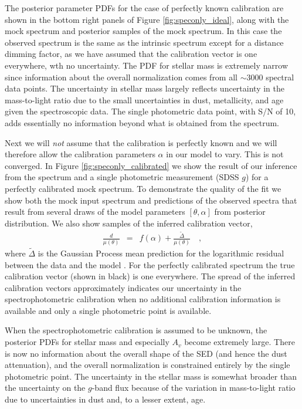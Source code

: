 \documentclass[iop,numberedappendix]{emulateapj}
\begin{document}
The posterior parameter PDFs for the case of perfectly known
calibration are shown in the bottom right panels of Figure
\ref{fig:speconly_ideal}, along with the mock spectrum and posterior
samples of the mock spectrum.  In this case the observed spectrum is
the same as the intrinsic spectrum except for a distance dimming
factor, as we have assumed that the calibration vector is one
everywhere, wth no uncertainty. The PDF for stellar mass is extremely
narrow since information about the overall normalization comes from all
$\sim 3000$ spectral data points.  The uncertainty in stellar mass
largely reflects uncertainty in the mass-to-light ratio due to the
small uncertainties in dust, metallicity, and age given the
spectroscopic data. The single photometric data point,
with S/N of 10, adds essentially no information beyond what is
obtained from the spectrum.

Next we will \emph{not} assume that the calibration is perfectly known
and we will therefore allow the calibration parameters $\alpha$ in our
model to vary.  {\color{red} This is not converged.} In Figure
\ref{fig:speconly_calibrated} we show the result of our inference from
the spectrum and a single photometric measurement (SDSS $g$) for a
perfectly calibrated mock spectrum. To demonstrate the quality of the
fit we show both the mock input spectrum and predictions of the
observed spectra that result from several draws of the model
parameters $[\theta, \alpha]$ from posterior distribution.  We also
show samples of the inferred calibration vector,
\begin{eqnarray} \label{eq:calibration}
\frac{d}{\mu(\theta)} & = & f(\alpha) + \frac{\tilde{\Delta}}{\mu(\theta)}
\quad ,
\end{eqnarray}
where $\tilde{\Delta}$ is the Gaussian Process mean prediction for the
logarithmic residual between the data and the model \citep{RW}.  For the
perfectly calibrated spectrum the true calibration vector (shown in
black) is one everywhere.  The spread of the inferred calibration
vectors approximately indicates our uncertainty in the spectrophotometric
calibration when no additional calibration information is available
and only a single photometric point is available.

When the spectrophotometric calibration is assumed to be unknown,
the posterior PDFs for stellar mass and especially $A_v$ become
extremely large.  There is now no information about the overall shape
of the SED (and hence the dust attenuation), and the overall
normalization is constrained entirely by the single photometric point.
The uncertainty in the stellar mass is somewhat broader than the
uncertainty on the $g$-band flux because of the variation in
mass-to-light ratio due to uncertainties in dust and, to a lesser
extent, age.
\end{document}
